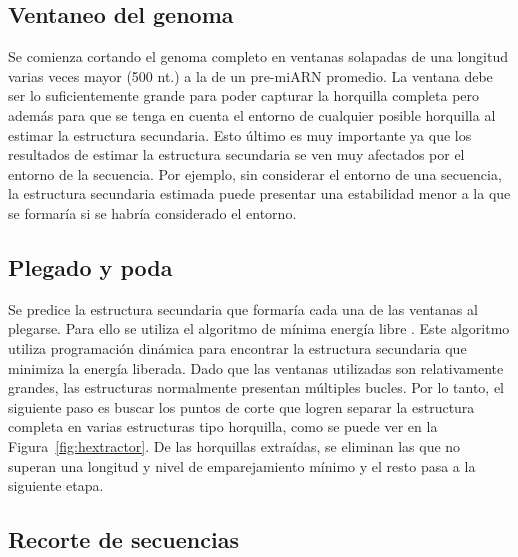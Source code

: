 \subsection{Ventaneo del genoma}

Se comienza cortando el genoma completo en ventanas solapadas de una longitud varias veces mayor (500 nt.) a la de un pre-miARN promedio. La ventana debe ser lo
suficientemente grande para poder capturar la horquilla completa pero además para que se tenga en cuenta el entorno de cualquier posible horquilla al estimar la
estructura secundaria. Esto último es muy importante ya que los resultados de estimar la estructura secundaria se ven muy afectados por el entorno de la
secuencia. Por ejemplo, sin considerar el entorno de una secuencia, la estructura secundaria estimada puede presentar una estabilidad menor a la que se formaría
si se habría considerado el entorno.

\subsection{Plegado y poda}

Se predice la estructura secundaria que formaría cada una de las ventanas al plegarse. Para ello se utiliza el algoritmo de mínima energía libre
\citep{zuker1981optimal}. Este algoritmo utiliza programación dinámica para encontrar la estructura secundaria que minimiza la energía liberada. Dado que las
ventanas utilizadas son relativamente grandes, las estructuras normalmente presentan múltiples bucles. Por lo tanto, el siguiente paso es buscar los puntos de
corte que logren separar la estructura completa en varias estructuras tipo horquilla, como se puede ver en la Figura~\ref{fig:hextractor}. De las horquillas
extraídas, se eliminan las que no superan una longitud y nivel de emparejamiento mínimo y el resto pasa a la siguiente etapa.

\subsection{Recorte de secuencias}

